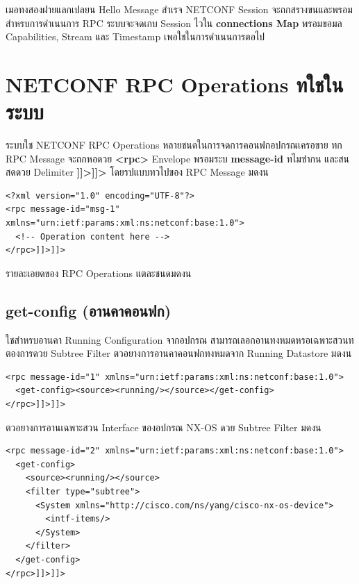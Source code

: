 \hspace*{1.3em}
เมอทงสองฝายแลกเปลยน Hello Message สำเรจ NETCONF Session จะถกสรางขนและพรอมสำหรบการดำเนนการ RPC ระบบจะจดเกบ Session ไวใน \textbf{connections Map} พรอมขอมล Capabilities, Stream และ Timestamp เพอใชในการดำเนนการตอไป

\section{NETCONF RPC Operations ทใชในระบบ}
\hspace*{1.3em}
ระบบใช NETCONF RPC Operations หลายชนดในการจดการคอนฟกอปกรณเครอขาย ทก RPC Message จะถกหอดวย \textbf{<rpc>} Envelope พรอมระบ \textbf{message-id} ทไมซำกน และสนสดดวย Delimiter \textbf{]]>]]>} โดยรปแบบทวไปของ RPC Message มดงน

{\fontsize{13}{14}\selectfont
\begin{verbatim}
<?xml version="1.0" encoding="UTF-8"?>
<rpc message-id="msg-1" xmlns="urn:ietf:params:xml:ns:netconf:base:1.0">
  <!-- Operation content here -->
</rpc>]]>]]>
\end{verbatim}
}

\hspace*{1.3em}
รายละเอยดของ RPC Operations แตละชนดมดงน

\subsection{get-config (อานคาคอนฟก)}
\hspace*{1.3em}
ใชสำหรบอานคา Running Configuration จากอปกรณ สามารถเลอกอานทงหมดหรอเฉพาะสวนทตองการดวย Subtree Filter ตวอยางการอานคาคอนฟกทงหมดจาก Running Datastore มดงน

{\fontsize{13}{14}\selectfont
\begin{verbatim}
<rpc message-id="1" xmlns="urn:ietf:params:xml:ns:netconf:base:1.0">
  <get-config><source><running/></source></get-config>
</rpc>]]>]]>
\end{verbatim}
}

\hspace*{1.3em}
ตวอยางการอานเฉพาะสวน Interface ของอปกรณ NX-OS ดวย Subtree Filter มดงน

{\fontsize{13}{14}\selectfont
\begin{verbatim}
<rpc message-id="2" xmlns="urn:ietf:params:xml:ns:netconf:base:1.0">
  <get-config>
    <source><running/></source>
    <filter type="subtree">
      <System xmlns="http://cisco.com/ns/yang/cisco-nx-os-device">
        <intf-items/>
      </System>
    </filter>
  </get-config>
</rpc>]]>]]>
\end{verbatim}
}

